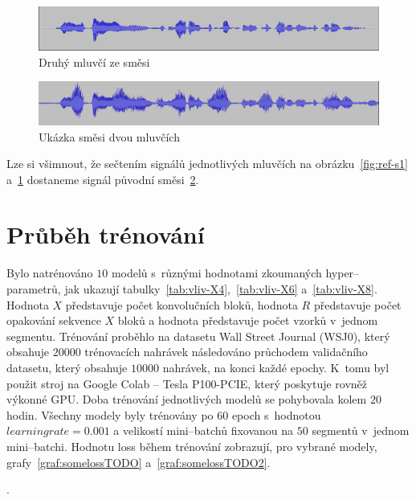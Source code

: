 \begin{figure}[H]
    \centering
    \includegraphics[scale=0.35]{obrazky-figures/dataset-s2.png}
    \caption{\label{fig:ref-s2}Druhý mluvčí ze směsi}
\end{figure}

\begin{figure}[H]
    \centering
    \includegraphics[scale=0.35]{obrazky-figures/dataset-mix.png}
    \caption{\label{fig:ref-mixture}Ukázka směsi dvou mluvčích}
\end{figure}

Lze si všimnout, že sečtením signálů jednotlivých mluvčích na obrázku~\ref{fig:ref-s1} a~\ref{fig:ref-s2} dostaneme signál původní směsi~\ref{fig:ref-mixture}.




\section{Průběh trénování}
Bylo natrénováno $10$ modelů s~různými hodnotami zkoumaných hyper--parametrů, jak ukazují tabulky~\ref{tab:vliv-X4},~\ref{tab:vliv-X6} a~\ref{tab:vliv-X8}. Hodnota $X$ představuje počet konvolučních bloků, hodnota $R$ představuje počet opakování sekvence $X$ bloků a hodnota  představuje počet vzorků v~jednom segmentu. Trénování proběhlo na datasetu Wall Street Journal (WSJ0), který obsahuje $20000$ trénovacích nahrávek následováno průchodem validačního datasetu, který obsahuje $10000$ nahrávek, na konci každé epochy. K~tomu byl použit stroj na Google Colab -- Tesla P100-PCIE, který poskytuje rovněž výkonné GPU. Doba trénování jednotlivých modelů se pohybovala kolem $20$ hodin. Všechny modely byly trénovány po 60 epoch s~hodnotou $learning rate = 0.001$ a velikostí mini--batchů fixovanou na $50$ segmentů v~jednom mini--batchi. Hodnotu loss během trénování zobrazují, pro vybrané modely, grafy~\ref{graf:somelossTODO} a~\ref{graf:somelossTODO2}.

.

